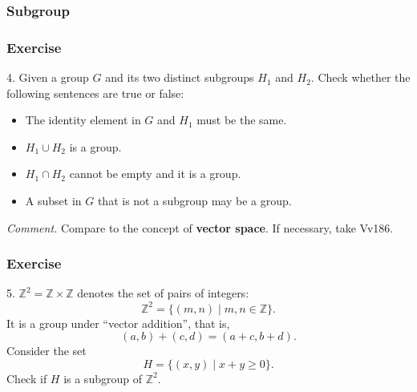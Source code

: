 \documentclass{beamer}
\begin{document}
\begin{frame}
    \frametitle{Subgroup}
\end{frame}
\begin{frame}
    \frametitle{Exercise}
    4.  Given a group $G$ and its two distinct subgroups $H_1$ and $H_2$. 
    Check whether the following sentences are true or false:
    \begin{itemize}
        \item The identity element in $G$ and $H_1$ must be the same.
        \item $H_1\cup H_2 $ is a group.
        \item $H_1 \cap H_2$ cannot be empty and it is a group.
        \item A subset in $G$ that is not a subgroup may be a group.
    \end{itemize}
    \vv \hh
    \textit{Comment.} Compare to the concept of \textbf{vector space}.
    If necessary, take Vv186.
\end{frame}
\begin{frame}
    \frametitle{Exercise}
    5. $\mathbb{Z}^2 = \mathbb{Z} \times \mathbb{Z}$ denotes the set of pairs of integers: 
    $$ \mathbb{Z}^2 = \{(m, n) \mid m, n \in \mathbb{Z}\}.$$ 
    It is a group under ``vector addition'', that is, 
    $$(a, b) + (c, d) = (a + c, b + d).$$ 
    Consider the set $$H = \{(x, y) \mid x + y \geqslant 0\}.$$ 
    Check if $H$ is a subgroup of $\mathbb{Z}^2$.
\end{frame}
\end{document}
